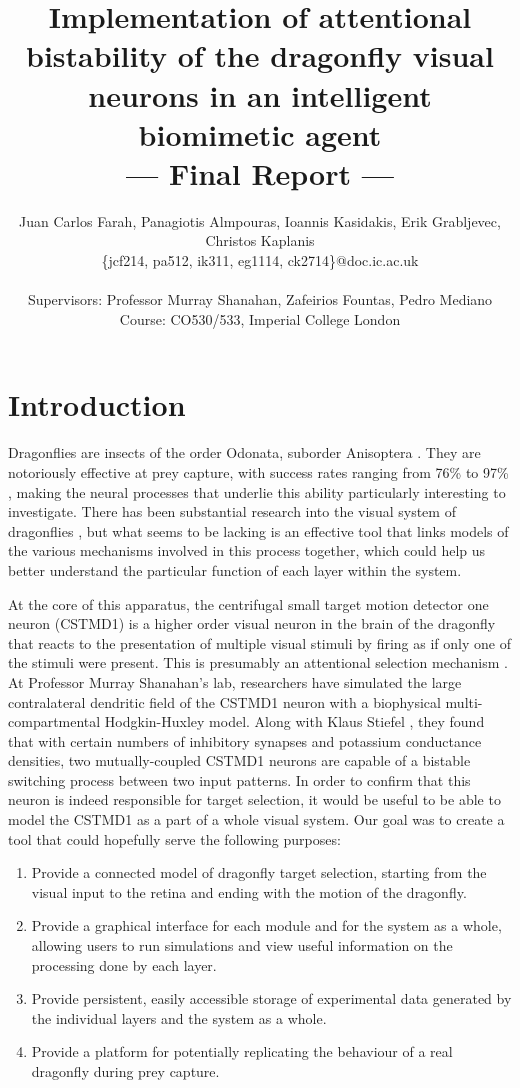 \documentclass[a4paper,11pt]{article}
\title{Implementation of attentional bistability of the dragonfly visual neurons in an intelligent biomimetic agent\\\Large{--- Final Report ---}}
\author{Juan Carlos Farah, Panagiotis Almpouras, Ioannis Kasidakis, Erik Grabljevec, Christos Kaplanis\\
       \{jcf214, pa512, ik311, eg1114, ck2714\}@doc.ic.ac.uk\\ \\
       \small{Supervisors: Professor Murray Shanahan, Zafeirios Fountas, Pedro Mediano}\\
       \small{Course: CO530/533, Imperial College London}
}
\begin{document}
\maketitle

\tableofcontents

\clearpage
\section{Introduction}

Dragonflies are insects of the order Odonata, suborder Anisoptera \cite{dfwiki}. They are notoriously effective at prey capture, with success rates ranging from 76\% to 97\% \cite{Olberg2011}, making the neural processes that underlie this ability particularly interesting to investigate. There has been substantial research into the visual system of dragonflies \cite{Wiederman2008, w13}, but what seems to be lacking is an effective tool that links models of the various mechanisms involved in this process together, which could help us better understand the particular function of each layer within the system.

At the core of this apparatus, the centrifugal small target motion detector one neuron (CSTMD1) is a higher order visual neuron in the brain of the dragonfly that reacts to the presentation of multiple visual stimuli by firing as if only one of the stimuli were present. This is presumably an attentional selection mechanism \cite{w13}. At Professor Murray Shanahan's lab, researchers have simulated the large contralateral dendritic field of the CSTMD1 neuron with a biophysical multi-compartmental Hodgkin-Huxley model. Along with Klaus Stiefel \cite{ne13}, they found that with certain numbers of inhibitory synapses and potassium conductance densities, two mutually-coupled CSTMD1 neurons are capable of a bistable switching process between two input patterns. In order to confirm that this neuron is indeed responsible for target selection, it would be useful to be able to model the CSTMD1 as a part of a whole visual system. Our goal was to create a tool that could hopefully serve the following purposes:
\begin{enumerate}
\item Provide a connected model of dragonfly target selection, starting from the visual input to the retina and ending with the motion of the dragonfly.
\item Provide a graphical interface for each module and for the system as a whole, allowing users to run simulations and view useful information on the processing done by each layer.
\item Provide persistent, easily accessible storage of experimental data generated by the individual layers and the system as a whole.
\item Provide a platform for potentially replicating the behaviour of a real dragonfly during prey capture.
\end{enumerate}
\end{document}
